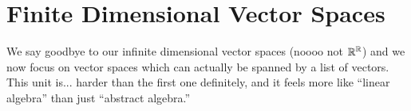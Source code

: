 \clearpage
\section{Finite Dimensional Vector Spaces}

We say goodbye to our infinite dimensional vector spaces (noooo not $\mathbb{R}^{\mathbb{R}}$) and we now focus on vector spaces which can actually be spanned by a list of vectors. This unit is... harder than the first one definitely, and it feels more like ``linear algebra'' than just ``abstract algebra.''





